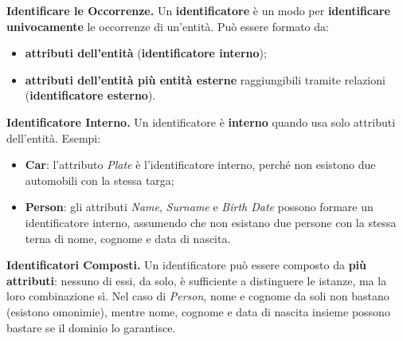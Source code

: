\documentclass[12pt]{extarticle}
\begin{document}
\noindent \textbf{Identificare le Occorrenze.} Un \textbf{identificatore} è un modo per \textbf{identificare univocamente} le occorrenze di un'entità. Può essere formato da:
\begin{itemize}
    \item \textbf{attributi dell'entità} (\textbf{identificatore interno});
    \item \textbf{attributi dell'entità più entità esterne} raggiungibili tramite relazioni (\textbf{identificatore esterno}).
\end{itemize}

\medskip
\noindent \textbf{Identificatore Interno.} Un identificatore è \textbf{interno} quando usa solo attributi dell'entità. Esempi:
\begin{itemize}
    \item \textbf{Car}: l'attributo \textit{Plate} è l'identificatore interno, perché non esistono due automobili con la stessa targa;
    \item \textbf{Person}: gli attributi \textit{Name}, \textit{Surname} e \textit{Birth Date} possono formare un identificatore interno, assumendo che non esistano due persone con la stessa terna di nome, cognome e data di nascita.
\end{itemize}

\begin{center}
\end{center}


\medskip
\noindent \textbf{Identificatori Composti.} Un identificatore può essere composto da \textbf{più attributi}: nessuno di essi, da solo, è sufficiente a distinguere le istanze, ma la loro combinazione sì. Nel caso di \textit{Person}, nome e cognome da soli non bastano (esistono omonimie), mentre nome, cognome e data di nascita insieme possono bastare se il dominio lo garantisce.
\end{document}
